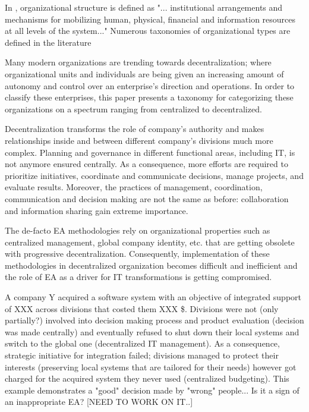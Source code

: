In \cite{sachdeva1990}, organizational structure is defined as "... institutional arrangements and mechanisms for mobilizing human, physical, financial and information resources at all levels of the system..." Numerous taxonomies of organizational types are defined in the literature


Many modern organizations are trending towards decentralization; where organizational units and individuals are being given an increasing amount of autonomy and control over an enterprise's direction and operations. In order to classify these enterprises, this paper presents a taxonomy for categorizing these organizations on a spectrum ranging from centralized to decentralized. 

Decentralization transforms the role of company's authority and makes relationships inside and between different company's divisions much more complex. Planning and governance in different functional areas, including IT,  is not anymore ensured centrally. As a consequence, more efforts are required to prioritize initiatives, coordinate and communicate decisions, manage projects, and evaluate results. Moreover, the practices of management, coordination, communication and decision making are not the same as before: collaboration and information sharing gain extreme importance.

The de-facto EA methodologies rely on organizational properties such as centralized management, global company identity, etc.  that are getting obsolete with progressive decentralization.  Consequently, implementation of these methodologies in decentralized organization becomes difficult and inefficient and  the role of EA as a driver for IT transformations is getting compromised.

A company Y acquired a software system  with an objective of integrated support of XXX across divisions that costed them  XXX \$. Divisions  were not (only partially?) involved into decision making process and product evaluation (decision was made centrally) and eventually refused to shut down their local systems and switch to the global one (decentralized IT management). As a consequence, strategic initiative for integration failed; divisions managed to protect their interests (preserving local systems that are tailored for their needs) however  got charged for the acquired system they never used (centralized budgeting). This example demonstrates a "good" decision made by "wrong" people... Is it a sign of an inappropriate EA? [NEED TO WORK ON IT..]



